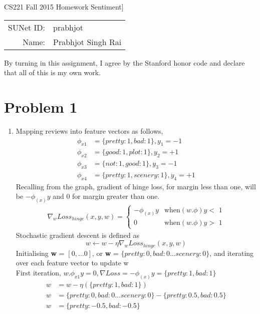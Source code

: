 \documentclass[12pt]{article}
\begin{document}
\begin{center}
{\Large CS221 Fall 2015 Homework Sentiment]}

\begin{tabular}{rl}
SUNet ID: & prabhjot \\
Name: & Prabhjot Singh Rai
\end{tabular}
\end{center}

By turning in this assignment, I agree by the Stanford honor code and declare
that all of this is my own work.

\section*{Problem 1}

\begin{enumerate}[label=(\alph*)]
  \item Mapping reviews into feature vectors as follows,
\begin{align*}
\phi_{x1} & = \{ pretty: 1, bad: 1 \}, y_1 = -1 \\
\phi_{x2} & = \{ good: 1, plot: 1\}, y_2 = +1 \\
\phi_{x3} & = \{ not:1, good: 1\}, y_3 = -1 \\
\phi_{x4} & = \{ pretty: 1, scenery: 1 \}, y_4 = +1
\end{align*}
Recalling from the graph, gradient of hinge loss, for margin less than one, will be $-\phi_{(x)}y$ and $0$ for margin greater than one.
\begin{align*}
\nabla_w Loss_{hinge}(x, y, w) = \begin{cases}
-\phi_{(x)}y & \text{when$(w.\phi)y <$ 1} \\
0 & \text{when$(w.\phi)y >$ 1}
\end{cases}
\end{align*}
Stochastic gradient descent is defined as
$$ w \leftarrow w - \eta \nabla_w Loss_{hinge}(x, y, w) $$
Initialising \textbf{w} = $[0, \dots 0]$, or \textbf{w} = $\{ pretty: 0, bad: 0 \dots scenery: 0\}$, and iterating over each feature vector to update w \\
First iteration, $w.\phi_{x1}y = 0, \nabla Loss = -\phi_{(x)}y = \{ pretty: 1, bad: 1\}$
\begin{align*}
w &= w - \eta (\{pretty: 1, bad: 1\}) \\
w &= \{ pretty: 0, bad: 0 \dots scenery: 0\} - \{pretty: 0.5, bad: 0.5\} \\
w &= \{ pretty: -0.5, bad: -0.5 \}
\end{align*}

\end{enumerate}
\end{document}
